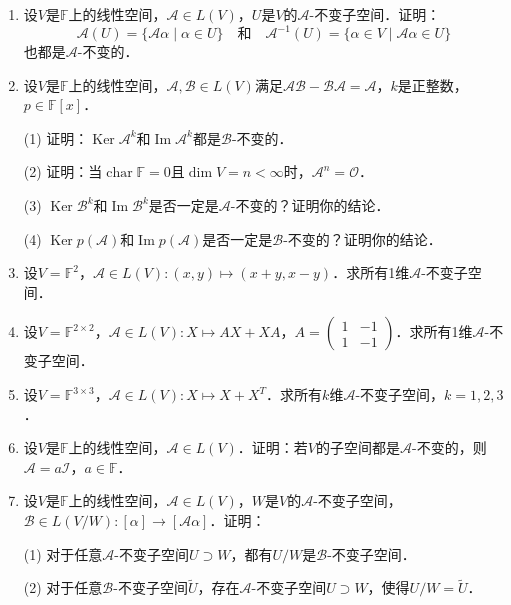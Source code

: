 \documentclass[a4paper,fontset=windows]{ctexbook}
\theoremstyle{definition}
\DeclareMathOperator{\Char}{char}
\DeclareMathOperator{\im}{Im}
\DeclareMathOperator{\Ker}{Ker}
\begin{document}
\begin{enumerate}
\item 设$V$是$\mathbb{F}$上的线性空间，$\mathcal{A}\in L(V)$，$U$是$V$的$\mathcal{A}$-不变子空间．证明：
$$\mathcal{A}(U)=\{\mathcal{A}\alpha\mid\alpha\in U\}\quad\text{和}\quad\mathcal{A}^{-1}(U)=\{\alpha\in V\mid\mathcal{A}\alpha\in U\}$$
也都是$\mathcal{A}$-不变的．

\item 设$V$是$\mathbb{F}$上的线性空间，$\mathcal{A,B}\in L(V)$满足$\mathcal{AB-BA=A}$，$k$是正整数，$p\in\mathbb{F}[x]$．

(1) 证明：$\Ker\mathcal{A}^k$和$\im\mathcal{A}^k$都是$\mathcal{B}$-不变的．

(2) 证明：当$\Char\mathbb{F}=0$且$\dim V=n<\infty$时，$\mathcal{A}^n=\mathcal{O}$．

(3) $\Ker\mathcal{B}^k$和$\im\mathcal{B}^k$是否一定是$\mathcal{A}$-不变的？证明你的结论．

(4) $\Ker p(\mathcal{A})$和$\im p(\mathcal{A})$是否一定是$\mathcal{B}$-不变的？证明你的结论．

\item 设$V=\mathbb{F}^2$，$\mathcal{A}\in L(V):(x,y)\mapsto(x+y,x-y)$．求所有1维$\mathcal{A}$-不变子空间．

\item 设$V=\mathbb{F}^{2\times 2}$，$\mathcal{A}\in L(V):X\mapsto AX+XA$，$A=\begin{pmatrix}1&-1 \\ 1&-1\end{pmatrix}$．求所有1维$\mathcal{A}$-不变子空间．

\item 设$V=\mathbb{F}^{3\times 3}$，$\mathcal{A}\in L(V):X\mapsto X+X^T$．求所有$k$维$\mathcal{A}$-不变子空间，$k=1,2,3$．

\item 设$V$是$\mathbb{F}$上的线性空间，$\mathcal{A}\in L(V)$．证明：若$V$的子空间都是$\mathcal{A}$-不变的，则$\mathcal{A}=a\mathcal{I}$，$a\in\mathbb{F}$．

\item 设$V$是$\mathbb{F}$上的线性空间，$\mathcal{A}\in L(V)$，$W$是$V$的$\mathcal{A}$-不变子空间，$\mathcal{B}\in L(V/W):[\alpha]\to[\mathcal{A}\alpha]$．证明：

(1) 对于任意$\mathcal{A}$-不变子空间$U\supset W$，都有$U/W$是$\mathcal{B}$-不变子空间．

(2) 对于任意$\mathcal{B}$-不变子空间$\widetilde{U}$，存在$\mathcal{A}$-不变子空间$U\supset W$，使得$U/W=\widetilde{U}$．


\end{enumerate}
\end{document}
